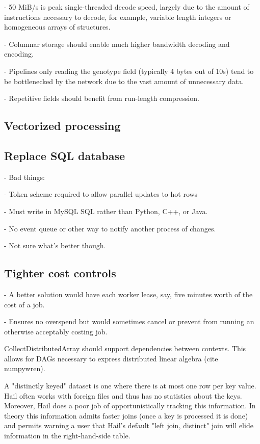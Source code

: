 \documentclass[10pt,a4paper%
]{article}
\begin{document}
    - 50 MiB/s is peak single-threaded decode speed, largely due to the amount of instructions necessary to decode, for example, variable length integers or homogeneous arrays of structures.

    - Columnar storage should enable much higher bandwidth decoding and encoding.

    - Pipelines only reading the genotype field (typically 4 bytes out of 10s) tend to be bottlenecked by the network due to the vast amount of unnecessary data.

    - Repetitive fields should benefit from run-length compression.

\subsection{Vectorized processing}

\subsection{Replace SQL database}

    - Bad things:

      - Token scheme required to allow parallel updates to hot rows

      - Must write in MySQL SQL rather than Python, C++, or Java.

      - No event queue or other way to notify another process of changes.

    - Not sure what’s better though.

\subsection{Tighter cost controls}

    - A better solution would have each worker lease, say, five minutes worth of the cost of a job.

    - Ensures no overspend but would sometimes cancel or prevent from running an otherwise acceptably costing job.

CollectDistributedArray should support dependencies between contexts. This allows for DAGs necessary to express distributed linear algebra (cite numpywren).

A "distinctly keyed" dataset is one where there is at most one row per key value. Hail often works with foreign files and thus has no statistics about the keys. Moreover, Hail does a poor job of opportunistically tracking this information. In theory this information admits faster joins (once a key is processed it is done) and permits warning a user that Hail’s default "left join, distinct" join will elide information in the right-hand-side table.
\end{document}
